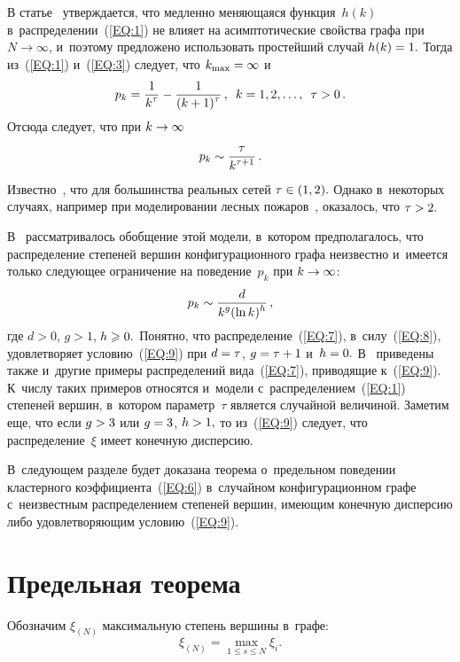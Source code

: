 \begin{multicols}{2}
В статье~\cite{RN1} утверждается, что медленно ме\-ня\-юща\-яся функция~$h(k)$ 
в~распределении~(\ref{EQ:1}) не влияет на асимптотические свойства графа при
$N\rightarrow\infty$, и~поэтому предложено использовать простейший случай $h(k)\hm=1.$ 
Тогда из~(\ref{EQ:1}) и~(\ref{EQ:3}) следует, что $k_{\max}\hm=\infty$ и~\begin{equation}
\label{EQ:7}
p_k=\displaystyle\frac{\displaystyle 1\mathstrut}{\displaystyle k^\tau\mathstrut}-\displaystyle\frac{\displaystyle 1\mathstrut}{\displaystyle (k+1)^\tau\mathstrut}\,, \enskip k=1,2,\ldots, \enskip \tau >0\,.
\end{equation}
Отсюда следует, что при $k\hm\rightarrow \infty$
\begin{equation}
\label{EQ:8}
p_k \sim \displaystyle\frac{\displaystyle \tau\mathstrut}{\displaystyle k^{\tau +1}\mathstrut}\,.
\end{equation}
Известно~\cite{Hof}, что для большинства реальных сетей $\tau \hm\in (1,2).$ 
Однако в~некоторых случаях, например при моделировании лесных пожаров~\cite{Ler}, 
оказалось, что $\tau \hm>2.$

В~\cite{Pav1} рассматривалось обобщение этой модели, в~котором 
предполагалось, что распределение степеней вершин конфигурационного графа
неизвестно и~имеется только следующее ограничение на поведение~$p_k$ 
при $k\hm\rightarrow \infty$:
\begin{equation}
\label{EQ:9}
p_k\sim \displaystyle\frac{\displaystyle d\mathstrut}{\displaystyle k^g(\ln k)^h\mathstrut}\,,
\end{equation}
где $d>0$, $g>1$, $h\hm\geqslant 0.$ Понятно, что распределение~(\ref{EQ:7}), 
в~силу~(\ref{EQ:8}), удовлетворяет условию~(\ref{EQ:9}) при $d\hm=\tau$,
$g\hm=\tau \hm+1$ и~$h\hm=0.$
В~\cite{Pav1} приведены также и~другие примеры распределений вида~(\ref{EQ:7}),
 приводящие к~(\ref{EQ:9}). К~числу таких примеров относятся и~модели
с~распределением~(\ref{EQ:1}) степеней вершин, в~котором параметр~$\tau$ 
является случайной величиной. Заметим еще, что если $g\hm>3$ или $g\hm=3$,
$h\hm>1,$ то из~(\ref{EQ:9}) следует, что распределение~$\xi$ имеет 
конечную дисперсию.

 В~следующем разделе будет доказана тео\-ре\-ма 
о~предельном поведении
кластерного коэффициента~(\ref{EQ:6}) в~случайном конфигурационном графе
 с~неизвестным распределением степеней вершин, име\-ющим конечную дисперсию
либо удовлетворяющим условию~(\ref{EQ:9}).

\section{Предельная теорема}

Обозначим $\xi_{(N)}$ максимальную степень вершины в~графе:
$$
\xi_{(N)}=\max\limits_{1\leqslant s \leqslant N} \xi_i.
$$


\end{multicols}
